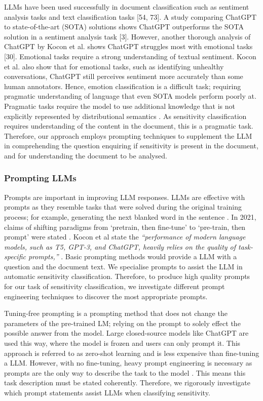 LLMs have been used successfully in document classification such as sentiment analysis tasks \cite{gao2020making, qin2023chatgpt, amin2023will} and text classification tasks [54, 73]. A study comparing ChatGPT to state-of-the-art (SOTA) solutions shows ChatGPT outperforms the SOTA solution in a sentiment analysis task [3]. However, another thorough analysis of ChatGPT by Kocon et al. shows ChatGPT struggles most with emotional tasks [30]. Emotional tasks require a strong understanding of textual sentiment. Kocon et al. also show that for emotional tasks, such as identifying unhealthy conversations, ChatGPT still perceives sentiment more accurately than some human annotators. Hence, emotion classification is a difficult task; requiring pragmatic understanding of language that even SOTA models perform poorly at. Pragmatic tasks require the model to use additional knowledge that is not explicitly represented by distributional semantics \cite{kocon2023chatgpt}. As sensitivity classification requires understanding of the content in the document, this is a pragmatic task. Therefore, our approach employs prompting techniques to supplement the LLM in comprehending the question enquiring if sensitivity is present in the document, and for understanding the document to be analysed.

\subsubsection{Prompting LLMs}
Prompts are important in improving LLM responses. LLMs are effective with prompts as they resemble tasks that were solved during the original training process; for example, generating the next blanked word in the sentence \cite{liu2023pre}. In 2021, claims of shifting paradigms from ‘pretrain, then fine-tune’ to ‘pre-train, then prompt’ were stated \cite{liu2023pre}. Kocon et al state the \textit{“performance of modern language models, such as T5, GPT-3, and ChatGPT, heavily relies on the quality of task-specific prompts,”} \cite{kocon2023chatgpt}. Basic prompting methods would provide a LLM with a question and the document text. We specialise prompts to assist the LLM in automatic sensitivity classification. Therefore, to produce high quality prompts for our task of sensitivity classification, we investigate different prompt engineering techniques to discover the most appropriate prompts.

Tuning-free prompting is a prompting method that does not change the parameters of the pre-trained LM; relying on the prompt to solely effect the possible answer from the model. Large closed-source models like ChatGPT \cite{brown2020language} are used this way, where the model is frozen and users can only prompt it. This approach is referred to as zero-shot learning and is less expensive than fine-tuning a LLM. However, with no fine-tuning, heavy prompt engineering is necessary as prompts are the only way to describe the task to the model \cite{liu2023pre}. This means this task description must be stated coherently. Therefore, we rigorously investigate which prompt statements assist LLMs when classifying sensitivity.

